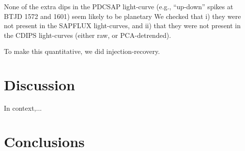 \documentclass[12pt,twocolumn,tighten]{aastex62}
\begin{document}
None of the extra dips in the PDCSAP light-curve (e.g., ``up-down''
spikes at BTJD 1572 and 1601) seem likely to be planetary
We checked that i) they were not present in the SAPFLUX light-curves,
and ii) that they were not present in the CDIPS light-curves (either
raw, or PCA-detrended).

To make this quantitative, we did injection-recovery.



\section{Discussion}
\label{sec:discussion}

In context,...


\section{Conclusions}
\label{sec:conclusions}




\end{document}
